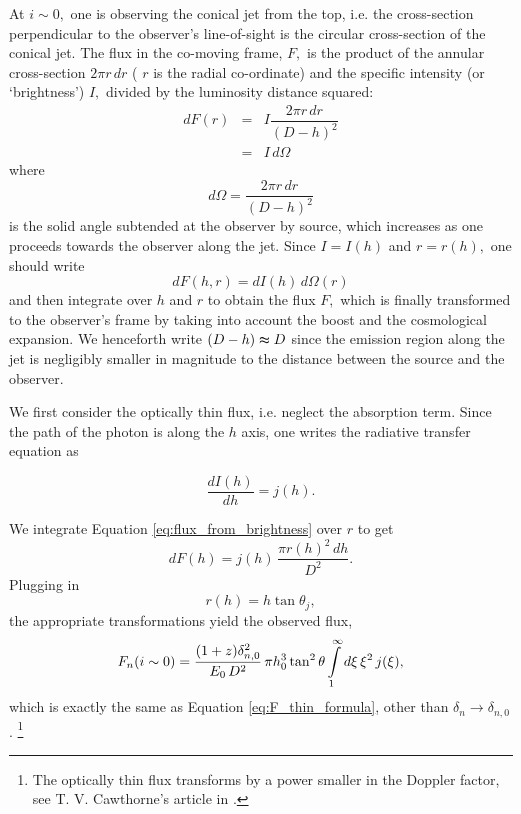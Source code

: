 At $ i \sim 0, $ one is observing the conical jet from the top, i.e. the cross-section perpendicular to the observer's line-of-sight is the circular cross-section of the conical jet. The flux in the co-moving frame, $ F, $ is the product of the annular cross-section $ 2 \pi r \, dr $ ( $ r $ is the radial co-ordinate) and the specific intensity (or `brightness') $ I, $ divided by the luminosity distance squared:
\begin{eqnarray}
dF(r) & = & I \dfrac{2 \pi r \, dr}{ (D-h)^2 }\\
 & = & I \, d \Omega
\end{eqnarray}
where
\begin{equation}
d \Omega = \dfrac{2 \pi r \, dr}{ (D-h)^2 }
\end{equation}
is the solid angle subtended at the observer by source, which increases as one proceeds towards the observer along the jet. Since $ I = I (h) $ and $ r = r(h), $ one should write 
\begin{equation}
dF(h, r) = dI(h) \, d \Omega (r) \label{eq:flux_from_brightness}
\end{equation}
and then integrate over $ h $ and $ r $ to obtain the flux $ F , $ which is finally transformed to the observer's frame by taking into account the boost and the cosmological expansion. We henceforth write $ (D-h) \thickapprox D $ since the emission region along the jet is negligibly smaller in magnitude to the distance between the source and the observer.

We first consider the optically thin flux, i.e. neglect the absorption term. Since the path of the photon is along the $ h $ axis, one writes the radiative transfer equation as

\begin{equation}
\dfrac{dI(h)}{dh} = j(h). \label{eq:optically_thin_radiative_transfer_equation}
\end{equation}

We integrate Equation \ref{eq:flux_from_brightness} over $ r $ to get 
\begin{equation}
dF(h) = j(h) \, \dfrac{\pi r(h)^{2}\, dh}{D^2}.
\end{equation}
Plugging in
\begin{equation}
r(h) = h \tan \theta_j, \label{eq:r_of_h}
\end{equation}
the appropriate transformations yield the observed flux,
\begin{equation}
F_{n}  (i \sim 0) = \frac{ (1+z) \delta_{n,0}^2 }{ \ee\, D^2 } \, \pi h_0^{3} \tan^2 \theta \intop_{1}^{\infty} d \xi \, \xi^2 \, j(\xi) ,
\end{equation}
which is exactly the same as Equation \ref{eq:F_thin_formula}, other than $ \delta_n \to \delta_{n,0} $. \footnote{The optically thin flux transforms by a power smaller in the Doppler factor, see T. V. Cawthorne's article in \citealt{Beams_and_jets}.}


